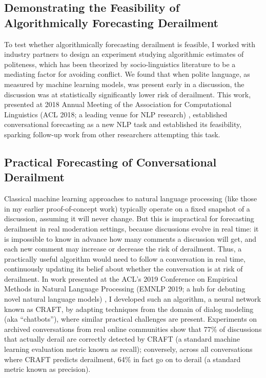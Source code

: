 \documentclass[12pt,letterpaper]{article}
\begin{document}
\subsection{Demonstrating the Feasibility of Algorithmically Forecasting Derailment}
To test whether algorithmically forecasting derailment is feasible, I worked with industry partners
to design an experiment studying algorithmic estimates of politeness, which has been theorized by socio-linguistics literature to be a mediating factor for avoiding conflict. We found that when polite language, as measured by machine learning models, was present early in a discussion, the discussion was at statistically significantly lower risk of derailment.
This work, presented at 2018 Annual Meeting of the Association for Computational Linguistics (ACL 2018; a leading venue for NLP research) \cite{zhang_conversations_2018}, established conversational forecasting as a new NLP task and established its feasibility, sparking follow-up work from other researchers attempting this task.

\subsection{Practical Forecasting of Conversational Derailment}
Classical machine learning approaches to natural language processing 
(like those in my earlier proof-of-concept work) 
typically operate on a fixed snapshot of a discussion, assuming it will never change.
But this is impractical for forecasting derailment in real moderation settings, because discussions evolve in real time: it is impossible to know in advance how many comments a discussion will get, and each new comment may increase or decrease the risk of derailment.
Thus, a practically useful algorithm would need to follow a conversation in real time, continuously updating its belief about whether the conversation is at risk of derailment.
In work presented at the ACL's 2019 Conference on Empirical Methods in Natural Language Processing (EMNLP 2019; a hub for debuting novel natural language models) \cite{chang_trouble_2019}, I developed such an algorithm, a neural network known as CRAFT, by adapting techniques from the domain of dialog modeling (aka ``chatbots''), where similar practical challenges are present.
Experiments on archived conversations from real online communities show that 77\% of discussions that actually derail are correctly detected by CRAFT (a standard machine learning evaluation metric known as recall); conversely, across all conversations where CRAFT predicts derailment, 64\% in fact go on to derail (a standard metric known as precision).
\end{document}
